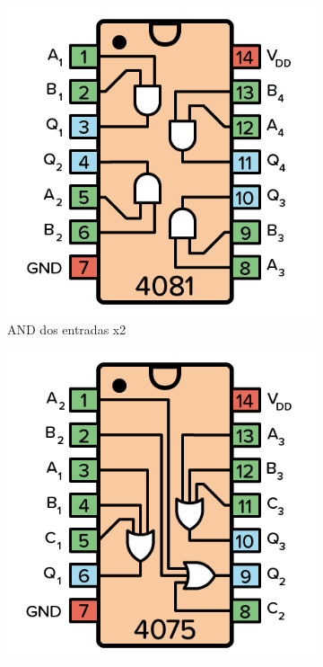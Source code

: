 \begin{center}
\begin{figure}[h!]
\begin{subfigure}[b]{0.45\linewidth}
\includegraphics[width=\linewidth]{./imagenes/cd4081.png}
\caption{AND dos entradas x2}
\end{subfigure}
\begin{subfigure}[c]{0.45\linewidth}
\includegraphics[width=\linewidth]{./imagenes/cd4075.png}

\end{subfigure}
\end{figure}
\end{center}
